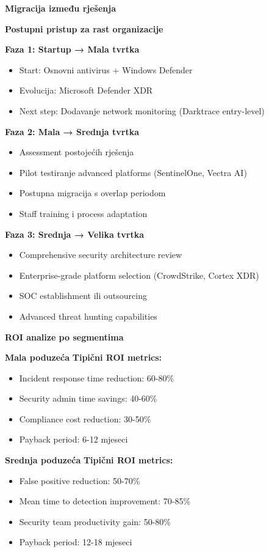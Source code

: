 \textbf{Migracija između rješenja}

\textbf{Postupni pristup za rast organizacije}

\textbf{Faza 1: Startup → Mala tvrtka}
\begin{itemize}
\item Start: Osnovni antivirus + Windows Defender
\item Evolucija: Microsoft Defender XDR
\item Next step: Dodavanje network monitoring (Darktrace entry-level)
\end{itemize}

\textbf{Faza 2: Mala → Srednja tvrtka}
\begin{itemize}
\item Assessment postojećih rješenja
\item Pilot testiranje advanced platforms (SentinelOne, Vectra AI)
\item Postupna migracija s overlap periodom
\item Staff training i process adaptation
\end{itemize}

\textbf{Faza 3: Srednja → Velika tvrtka}
\begin{itemize}
\item Comprehensive security architecture review
\item Enterprise-grade platform selection (CrowdStrike, Cortex XDR)
\item SOC establishment ili outsourcing
\item Advanced threat hunting capabilities
\end{itemize}

\textbf{ROI analize po segmentima}

\textbf{Mala poduzeća}
\textbf{Tipični ROI metrics:}
\begin{itemize}
\item Incident response time reduction: 60-80\%
\item Security admin time savings: 40-60\%
\item Compliance cost reduction: 30-50\%
\item Payback period: 6-12 mjeseci
\end{itemize}

\textbf{Srednja poduzeća}
\textbf{Tipični ROI metrics:}
\begin{itemize}
\item False positive reduction: 50-70\%
\item Mean time to detection improvement: 70-85\%
\item Security team productivity gain: 50-80\%
\item Payback period: 12-18 mjeseci
\end{itemize}

